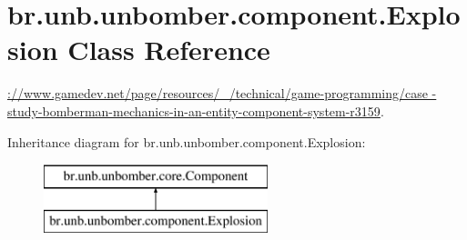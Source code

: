 \hypertarget{classbr_1_1unb_1_1unbomber_1_1component_1_1_explosion}{\section{br.\+unb.\+unbomber.\+component.\+Explosion Class Reference}
\label{classbr_1_1unb_1_1unbomber_1_1component_1_1_explosion}
}


\hyperlink{}{\+://www.gamedev.\+net/page/resources/\+\_\+/technical/game-\/programming/case -\/study-\/bomberman-\/mechanics-\/in-\/an-\/entity-\/component-\/system-\/r3159}.  


Inheritance diagram for br.\+unb.\+unbomber.\+component.\+Explosion\+:\begin{figure}[H]
\begin{center}
\leavevmode
\includegraphics[height=2.000000cm]{classbr_1_1unb_1_1unbomber_1_1component_1_1_explosion}
\end{center}
\end{figure}
